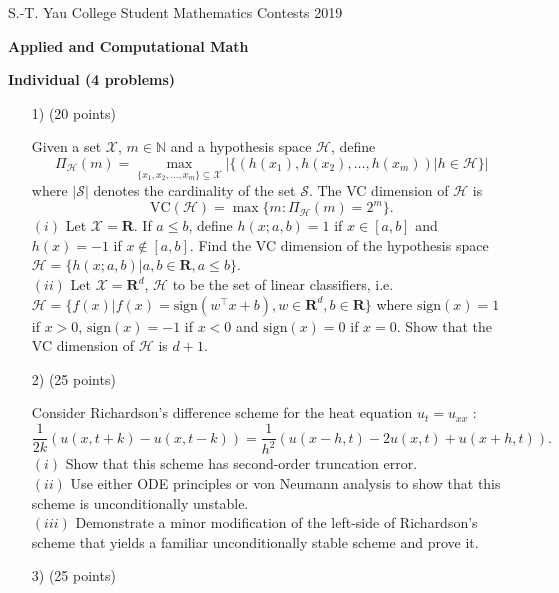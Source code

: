\documentclass[10pt]{article}
\renewcommand{\leq}{\leqslant}
\begin{document}
\begin{center}
S.-T. Yau College Student Mathematics Contests 2019

\vspace{0.1cm}

\Large {\bf Applied and Computational Math}

\vspace{0.1cm}

\large {\bf Individual (4 problems)}

\vspace{0.1cm}
\end{center}

\begin{enumerate}

\item[1)](20 points)

    Given a set $\mathcal X$, $m\in\mathbb{N}$ and a hypothesis space $\mathcal{H}$, define
    \begin{equation*}
    \Pi_{\mathcal{H}}(m) = \max_{\{x_1,x_2,\ldots,x_m\}\subseteq\mathcal X} |\{(h(x_1),h(x_2),\ldots,h(x_m))|h\in\mathcal{H}\}|
    \end{equation*}
    where $|\mathcal S|$ denotes the cardinality of the set $\mathcal S$. The VC dimension of $\mathcal H$ is
    \begin{equation*}
    \mathrm{VC} (\mathcal{H}) = \max\{m:\Pi_{\mathcal{H}}(m)=2^m\}.
    \end{equation*}
     $(i)$ Let $\mathcal X=\mathbf R$. If $a\leq b$, define $h(x;a,b) = 1$ if $x\in[a,b]$ and $h(x)=-1$ if $x\notin[a,b]$. Find the VC dimension of the hypothesis space $\mathcal{H}=\{h(x;a,b)|a,b\in\mathbf{R},a\leq b\}$.\\
    $(ii)$ Let $\mathcal X = \mathbf R^d$, $\mathcal{H}$ to be the set of linear classifiers,
    i.e.\ $\mathcal{H} = \{f(x)|f(x)=\mathrm{sign}(w^\top x+b), w\in\mathbf{R}^d,b\in\mathbf{R}\}$ where $\mathrm{sign}(x) = 1$ if $x>0$,
    $\mathrm{sign}(x)=-1$ if $x<0$ and $\mathrm{sign}(x)=0$ if $x=0$. Show that the VC dimension of $\mathcal{H}$ is $d+1$.

\item[2)](25 points)


    Consider Richardson's difference scheme for the heat equation $u_{t} = u_{xx}$ :
    \begin{equation*}
    \frac{1}{2k}\left( u(x, t+k) - u(x, t-k) \right)
    = \frac{1}{h^{2}}\left( u(x-h, t) - 2 u(x, t) + u(x+h, t) \right).
    \end{equation*}
      $(i)$ Show that this scheme has second-order truncation error.\\
      $(ii)$ Use either ODE principles or von Neumann analysis to show that this scheme is unconditionally unstable.\\
      $(iii)$ Demonstrate a minor modification of the left-side of Richardson's scheme that yields a familiar unconditionally stable scheme and prove it.
\item[3)](25 points) \label{ques:differeoftheta}


\end{enumerate}
\end{document}
